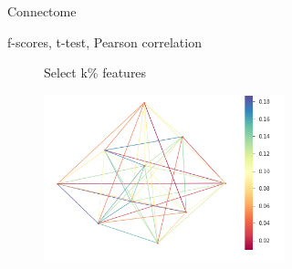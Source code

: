 \documentclass[msthesis.tex]{subfiles}
\begin{document}
\begin{figure}
\begin{subfigure}[b]{0.4\textwidth}
         \caption{Connectome}
         \label{fig:connectivity_matrix}
        \end{subfigure}
    \vfill
        \begin{subfigure}[b]{0.6\textwidth}
         \centering
         \vspace{2em}
        \begin{tcolorbox}[box align= center,coltitle=black!75!black, colback=yellow!5!white,colframe=yellow!50!black,
  colbacktitle=yellow!80!black,title=\centering \large Feature Representation]
        \centering
        f-scores, t-test, Pearson correlation
        \end{tcolorbox}
        \caption{}
         \label{fig:feature extraction}
         \end{subfigure}
    \vfill
    \begin{subfigure}[b]{0.9\textwidth}
    \begin{subfigure}[b]{0.3\textwidth}
        \begin{tcolorbox}[coltitle=black!60!black ,colback=yellow!5!white,colframe=yellow!50!black,
  colbacktitle=yellow!75!black, fontupper=\color{black}, title=\centering \large Feature Selection]
        Select k\% features
        \end{tcolorbox}
         \vspace{1cm}
         \label{fig:feature selection}
         \end{subfigure}
    \hfill
    \begin{subfigure}[b]{0.4\textwidth}
         \centering
         \includegraphics[height =0.8\textwidth,width=\textwidth]{images/mews.png}

\end{subfigure}
\end{subfigure}
\end{figure}
\end{document}
